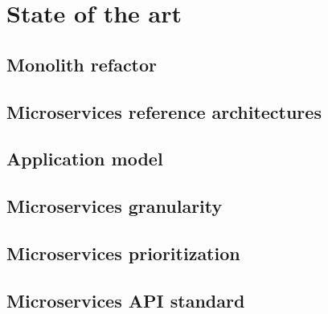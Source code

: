 \chapter{State of the art}
\label{chp:sota}

\section{Monolith refactor}
\label{chp:sota:sec:monolit-refactor}

\section{Microservices reference architectures}
\label{chp:sota:sec:microservices-ra}

\section{Application model}
\label{chp:sota:sec:application-model}

\section{Microservices granularity}
\label{chp:sota:sec:microservices-granularity}

\section{Microservices prioritization}
\label{chp:sota:sec:microservices=prioritization}

\section{Microservices API standard}
\label{chp:sota:sec:microservices-api-standard}
